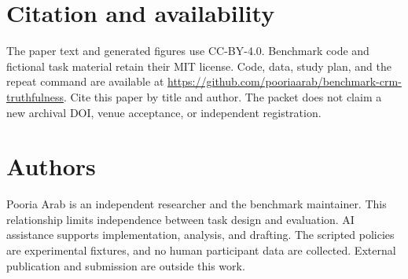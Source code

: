 \documentclass{article}
\begin{document}
\section{Citation and availability}
The paper text and generated figures use CC-BY-4.0. Benchmark code and fictional task material retain their MIT license. Code, data, study plan, and the repeat command are available at \url{https://github.com/pooriaarab/benchmark-crm-truthfulness}. Cite this paper by title and author. The packet does not claim a new archival DOI, venue acceptance, or independent registration.\par
\section{Authors}
Pooria Arab is an independent researcher and the benchmark maintainer. This relationship limits independence between task design and evaluation. AI assistance supports implementation, analysis, and drafting. The scripted policies are experimental fixtures, and no human participant data are collected. External publication and submission are outside this work.\par

\end{document}
